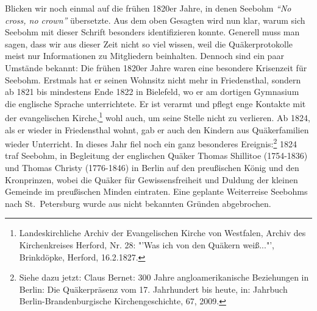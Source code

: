Blicken wir noch einmal auf die frühen 1820er Jahre, in denen Seebohm \textit{"`No
cross, no crown"'} übersetzte. Aus dem oben Gesagten wird nun klar, warum sich Seebohm
mit dieser Schrift besonders identifizieren konnte. Generell muss man sagen,
dass wir aus dieser Zeit nicht so viel wissen, weil die Quäkerprotokolle meist
nur Informationen zu Mitgliedern beinhalten. Dennoch sind ein paar Umstände
bekannt: Die frühen 1820er Jahre waren eine besondere Krisenzeit für Seebohm.
Erstmals hat er seinen Wohnsitz nicht mehr in Friedensthal, sondern ab 1821 bis
mindestens Ende 1822 in Bielefeld, wo er am dortigen Gymnasium die englische
Sprache unterrichtete. Er ist verarmt und pflegt enge Kontakte mit der
evangelischen Kirche,\footnote{Landeskirchliche Archiv der Evangelischen Kirche
von Westfalen, Archiv des
Kirchenkreises Herford, Nr. 28: "'Was ich von den Quäkern weiß..."', Brinkdöpke,
Herford, 16.2.1827.} wohl auch, um seine Stelle nicht zu verlieren. Ab
1824, als er wieder in Friedensthal wohnt, gab er auch den Kindern aus
Quäkerfamilien wieder Unterricht. In dieses Jahr fiel noch ein ganz besonderes
Ereignis:\footnote{Siehe dazu jetzt: Claus Bernet: 300 Jahre angloamerikanische
Beziehungen in
Berlin: Die Quäkerpräsenz vom 17. Jahrhundert bis heute, in: Jahrbuch
Berlin-Brandenburgische Kirchengeschichte, 67, 2009.} 1824 traf Seebohm, in
Begleitung der englischen Quäker Thomas Shillitoe (1754-1836) und Thomas Christy
(1776-1846) in Berlin auf den preußischen König und den Kronprinzen, wobei die
Quäker für Gewissensfreiheit und Duldung der kleinen Gemeinde im preußischen
Minden eintraten. Eine geplante Weiterreise Seebohms nach St.~Petersburg wurde
aus nicht bekannten Gründen abgebrochen.

\medskip

